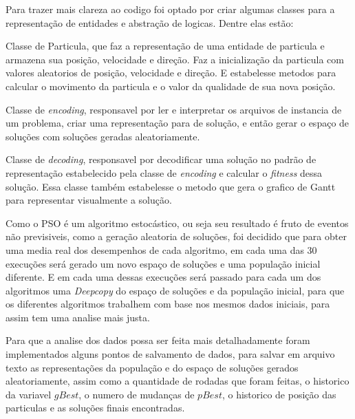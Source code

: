         Para trazer mais clareza ao codigo foi optado por criar algumas classes para a representação de entidades e abstração de logicas. Dentre elas estão:\newline
        
        Classe de Particula, que faz a representação de uma entidade de particula e armazena sua posição, velocidade e direção. Faz a inicialização da particula com valores aleatorios de posição, velocidade e direção. E estabelesse metodos para calcular o movimento da particula e o valor da qualidade de sua nova posição.\newline
        
        Classe de \textit{encoding}, responsavel por ler e interpretar os arquivos de instancia de um problema, criar uma representação para de solução, e então gerar o espaço de soluções com soluções geradas aleatoriamente.\newline
         
        Classe de \textit{decoding}, responsavel por decodificar uma solução no padrão de representação estabelecido pela classe de \textit{encoding} e calcular o \textit{fitness} dessa solução. Essa classe também estabelesse o metodo que gera o grafico de Gantt para representar visualmente a solução.\newline
        

        Como o PSO é um algoritmo estocástico, ou seja seu resultado é fruto de eventos não previsiveis, como a geração aleatoria de soluções, foi decidido que para obter uma media real dos desempenhos de cada algoritmo, em cada uma das 30 execuções será gerado um novo espaço de soluções e uma população inicial diferente.\newline
        E em cada uma dessas execuções será passado para cada um dos algoritmos uma \textit{Deepcopy} do espaço de soluções e da população inicial, para que os diferentes algoritmos trabalhem com base nos mesmos dados iniciais, para assim tem uma analise mais justa.\newline

        Para que a analise dos dados possa ser feita mais detalhadamente foram implementados alguns pontos de salvamento de dados, para salvar em arquivo texto as representações da população e do espaço de soluções gerados aleatoriamente, assim como a quantidade de rodadas que foram feitas, o historico da variavel $gBest$, o numero de mudanças de $pBest$, o historico de posição das particulas e as soluções finais encontradas.
    

